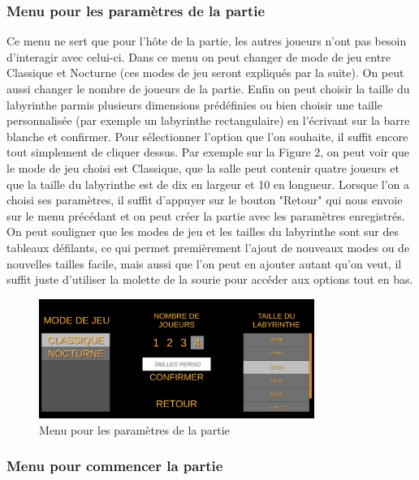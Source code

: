 \documentclass{article}
\begin{document}
\subsubsection{Menu pour les paramètres de la partie}

Ce menu ne sert que pour l'hôte de la partie, les autres joueurs n'ont pas besoin d'interagir avec celui-ci. Dans ce menu on peut changer de mode de jeu entre Classique et Nocturne (ces modes de jeu seront expliqués par la suite). On peut aussi changer le nombre de joueurs de la partie. Enfin on peut choisir la taille du labyrinthe parmis plusieurs dimensions prédéfinies ou bien choisir une taille personnalisée (par exemple un labyrinthe rectangulaire) en l'écrivant sur la barre blanche et confirmer. Pour sélectionner l'option que l'on souhaite, il suffit encore tout simplement de cliquer dessus. Par exemple sur la Figure 2, on peut voir que le mode de jeu choisi est Classique, que la salle peut contenir quatre joueurs et que la taille du labyrinthe est de dix en largeur et 10 en longueur. Lorsque l'on a choisi ses paramètres, il suffit d'appuyer sur le bouton "Retour" qui nous envoie sur le menu précédant et on peut créer la partie avec les paramètres enregistrés. On peut souligner que les modes de jeu et les tailles du labyrinthe sont sur des tableaux défilants, ce qui permet premièrement l'ajout de nouveaux modes ou de nouvelles tailles facile, mais aussi que l'on peut en ajouter autant qu'on veut, il suffit juste d'utiliser la molette de la sourie pour accéder aux options tout en bas.



\begin{figure}[!ht]
    \centering
    \includegraphics[width=0.8\textwidth]{Menu2.png}
    \caption{Menu pour les paramètres de la partie}
    \label{Menu pour les paramètres de la partie}
\end{figure}


\subsubsection{Menu pour commencer la partie}
\end{document}
